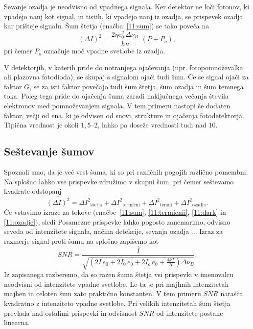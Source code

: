 Sevanje ozadja je neodvisno od vpadnega signala. Ker detektor ne loči fotonov, ki 
vpadejo nanj kot signal, in tistih, ki vpadejo nanj iz ozadja, se prispevek ozadja 
kar prišteje signalu. Šum štetja (enačba~\ref{11:sum}) se tako poveča na
\begin{equation}
\overline{(\Delta I)^2} = \frac{2 \eta e_0^2\, \Delta\nu_B}{h\nu}\,\,
\overline{\left( P + P_o \right)},
\label{11:ozadje}
\end{equation}
pri čemer $P_o$ označuje moč vpadne svetlobe iz ozadja.

\begin{remark}
 V detektorjih, v katerih pride do notranjega ojačevanja
 (npr. fotopomnoževalka
  ali plazovna fotodioda),
 se skupaj s signalom ojači tudi šum. Če se signal ojači za faktor $G$, se za isti faktor
 povečajo tudi šum štetja, šum ozadja in šum temnega toka. Poleg tega pride do ojačenja šuma
 zaradi naključnega večanja števila elektronov med pomnoževanjem signala. V tem primeru nastopi
 še dodaten faktor, večji od ena, ki je odvisen od snovi, strukture in ojačenja fotodetektorja. 
 Tipična vrednost je okoli $1,5$--$2$, lahko pa doseže vrednosti tudi nad $10$.
\end{remark}

\subsection*{Seštevanje šumov}
Spoznali smo, da je več vrst šuma, ki so pri različnih pogojih različno pomembni.
Na splošno lahko vse prispevke združimo v skupni šum, pri čemer seštevamo kvadrate
odstopanj
\begin{equation}
\overline{(\Delta I)^2} = \overline{\Delta I^2}_{\mathrm{\check{s}tetja}} + 
\overline{\Delta I^2}_{\mathrm{termi\check{c}ni}} + \overline{\Delta I^2}_{\mathrm{temni}} + 
\overline{\Delta I^2}_{\mathrm{ozadja}}.
\end{equation}
Če vstavimo izraze za tokove (enačbe~\ref{11:sum}, \ref{11:termicnii}, \ref{11:dark}
in \ref{11:ozadje}), sledi
Posamezne prispevke lahko pogosto zanemarimo, odvisno seveda od intenzitete signala,
načina detekcije, sevanja ozadja ... Izraz za razmerje signal proti šumu na splošno 
zapišemo kot
\begin{equation}
SNR = \frac{\overline{I}}{\sqrt{\left( 2 \overline{I}\,e_0 + 2 I_0\,e_0
+ 2 I_o\,e_0 + \frac{4 kT}{R} \right) \Delta\nu_B}}.
\end{equation}
Iz zapisanega razberemo, da so razen šuma štetja vsi prispevki v 
imenovalcu neodvisni od intenzitete vpadne svetlobe. Le-ta je pri 
majhnih intenzitetah majhen in celoten šum 
zato praktično konstanten. V tem primeru $SNR$ narašča kvadratno z intenziteto
vpadne svetlobe. Pri velikih intenzitetah šum štetja prevlada nad ostalimi prispevki
in odvisnost $SNR$ od intenzitete postane linearna. 


